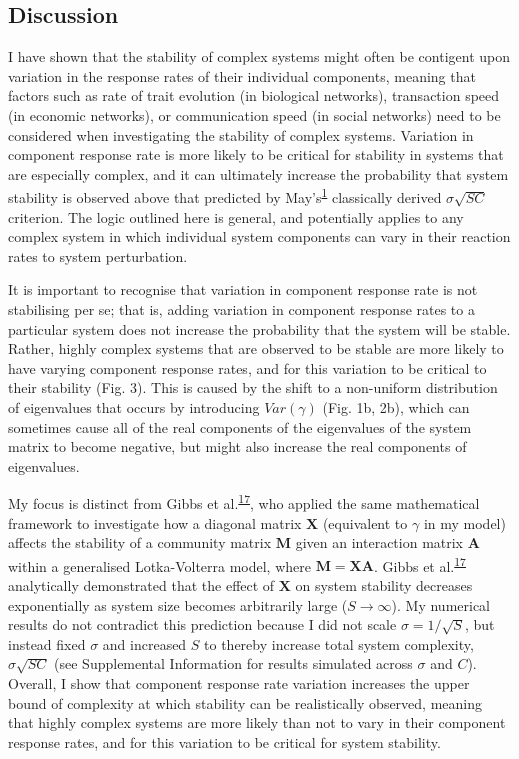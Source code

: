 \documentclass[]{article}
\begin{document}
\subsection{Discussion}\label{discussion}

I have shown that the stability of complex systems might often be
contigent upon variation in the response rates of their individual
components, meaning that factors such as rate of trait evolution (in
biological networks), transaction speed (in economic networks), or
communication speed (in social networks) need to be considered when
investigating the stability of complex systems. Variation in component
response rate is more likely to be critical for stability in systems
that are especially complex, and it can ultimately increase the
probability that system stability is observed above that predicted by
May's\textsuperscript{\protect\hyperlink{ref-May1972}{1}} classically
derived \(\sigma \sqrt{SC}\) criterion. The logic outlined here is
general, and potentially applies to any complex system in which
individual system components can vary in their reaction rates to system
perturbation.

It is important to recognise that variation in component response rate
is not stabilising per se; that is, adding variation in component
response rates to a particular system does not increase the probability
that the system will be stable. Rather, highly complex systems that are
observed to be stable are more likely to have varying component response
rates, and for this variation to be critical to their stability (Fig.
3). This is caused by the shift to a non-uniform distribution of
eigenvalues that occurs by introducing \(Var(\gamma)\) (Fig. 1b, 2b),
which can sometimes cause all of the real components of the eigenvalues
of the system matrix to become negative, but might also increase the
real components of eigenvalues.

My focus is distinct from Gibbs et
al.\textsuperscript{\protect\hyperlink{ref-Gibbs2017}{17}}, who applied
the same mathematical framework to investigate how a diagonal matrix
\(\mathbf{X}\) (equivalent to \(\gamma\) in my model) affects the
stability of a community matrix \(\mathbf{M}\) given an interaction
matrix \(\mathbf{A}\) within a generalised Lotka-Volterra model, where
\(\mathbf{M} = \mathbf{XA}\). Gibbs et
al.\textsuperscript{\protect\hyperlink{ref-Gibbs2017}{17}} analytically
demonstrated that the effect of \(\mathbf{X}\) on system stability
decreases exponentially as system size becomes arbitrarily large
(\(S \to \infty\)). My numerical results do not contradict this
prediction because I did not scale \(\sigma = 1 / \sqrt{S}\), but
instead fixed \(\sigma\) and increased \(S\) to thereby increase total
system complexity, \(\sigma\sqrt{SC}\) (see Supplemental Information for
results simulated across \(\sigma\) and \(C\)). Overall, I show that
component response rate variation increases the upper bound of
complexity at which stability can be realistically observed, meaning
that highly complex systems are more likely than not to vary in their
component response rates, and for this variation to be critical for
system stability.
\end{document}
